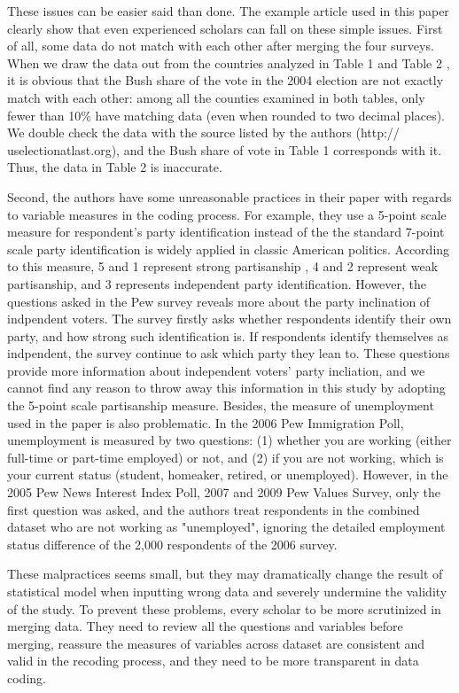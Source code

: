 These issues can be easier said than done. The example article used in this paper clearly show that even experienced scholars can fall on these simple issues. First of all, some data do not match with each other after merging the four surveys. When we draw the data out from the countries analyzed in Table 1 and Table 2 \citep{Newman2015}, it is obvious that the Bush share of the vote in the 2004 election are not exactly match with each other: among all the counties examined in both tables, only fewer than 10\% have matching data (even when rounded to two decimal places). We double check the data with the source listed by the authors (http:// uselectionatlast.org), and the Bush share of vote in Table 1 corresponds with it. Thus, the data in Table 2 is inaccurate. 



Second, the authors have some unreasonable practices in their paper with regards to variable measures in the coding process. For example, they use a 5-point scale measure for respondent's party identification instead of the the standard 7-point scale party identification is widely applied in classic American politics. According to this measure, 5 and 1 represent strong partisanship , 4 and 2 represent weak partisanship, and 3 represents independent party identification. However, the questions asked in the Pew survey reveals more about the party inclination of indpendent voters. The survey firstly asks whether respondents identify their own party, and how strong such identification is. If respondents identify themselves as indpendent, the survey continue to ask which party they lean to. These questions provide more information about independent voters' party incliation, and we cannot find any reason to throw away this information in this study by adopting the 5-point scale partisanship measure. Besides, the measure of unemployment used in the paper is also problematic. In the 2006 Pew Immigration Poll, unemployment is measured by two questions: (1) whether you are working (either full-time or part-time employed) or not, and (2) if you are not working, which is your current status (student, homeaker, retired, or unemployed). However, in the 2005 Pew News Interest Index Poll, 2007 and 2009 Pew Values Survey, only the first question was asked, and the authors treat respondents in the combined dataset who are not working as "unemployed", ignoring the detailed employment status difference of the 2,000 respondents of the 2006 survey.

These malpractices seems small, but they may dramatically change the result of statistical model when inputting wrong data and severely undermine the validity of the study. To prevent these problems, every scholar to be more scrutinized in merging data. They need to review all the questions and variables before merging, reassure the measures of variables across dataset are consistent and valid in the recoding process, and they need to be more transparent in data coding. 



